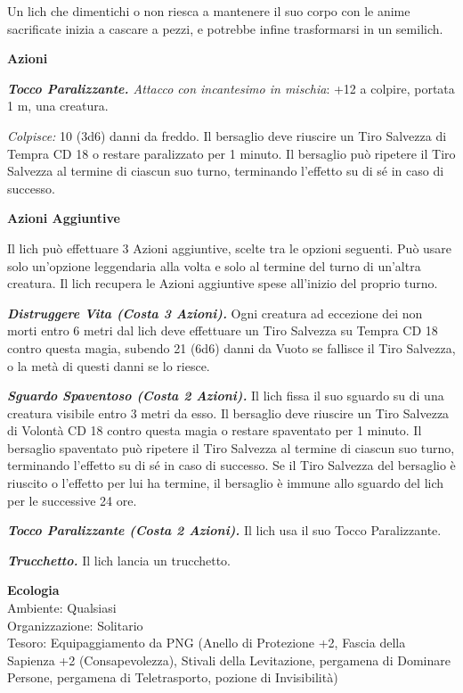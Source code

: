 \begin{multicols}{2}
Un lich che dimentichi o non riesca a mantenere il suo corpo con le anime sacrificate inizia a cascare a pezzi, e potrebbe infine trasformarsi in un semilich.

\textbf{Azioni}

\emph{\textbf{Tocco Paralizzante.} Attacco con incantesimo in mischia}: +12 a colpire, portata 1 m, una creatura.

\emph{Colpisce:} 10 (3d6) danni da freddo. Il bersaglio deve riuscire un Tiro Salvezza di Tempra CD 18 o restare paralizzato per 1 minuto. Il bersaglio può ripetere il Tiro Salvezza al termine di ciascun suo turno, terminando l'effetto su di sé in caso di successo.

\textbf{Azioni Aggiuntive}

Il lich può effettuare 3 Azioni aggiuntive, scelte tra le opzioni seguenti. Può usare solo un'opzione leggendaria alla volta e solo al termine del turno di un'altra creatura. Il lich recupera le Azioni aggiuntive spese all'inizio del proprio turno.

\emph{\textbf{Distruggere Vita (Costa 3 Azioni).}} Ogni creatura ad eccezione dei non morti entro 6 metri dal lich deve effettuare un Tiro Salvezza su Tempra CD 18 contro questa magia, subendo 21 (6d6) danni da Vuoto se fallisce il Tiro Salvezza, o la metà di questi danni se lo riesce.

\emph{\textbf{Sguardo Spaventoso (Costa 2 Azioni).}} Il lich fissa il suo sguardo su di una creatura visibile entro 3 metri da esso. Il bersaglio deve riuscire un Tiro Salvezza di Volontà CD 18 contro questa magia o restare spaventato per 1 minuto. Il bersaglio spaventato può ripetere il Tiro Salvezza al termine di ciascun suo turno, terminando l'effetto su di sé in caso di successo. Se il Tiro Salvezza del bersaglio è riuscito o l'effetto per lui ha termine, il bersaglio è immune allo sguardo del lich per le successive 24 ore.

\emph{\textbf{Tocco Paralizzante (Costa 2 Azioni).}} Il lich usa il suo Tocco Paralizzante.

\emph{\textbf{Trucchetto.}} Il lich lancia un trucchetto.

\textbf{Ecologia}\\
Ambiente: Qualsiasi\\
Organizzazione: Solitario\\
Tesoro: Equipaggiamento da PNG (Anello di Protezione +2, Fascia della Sapienza +2 (Consapevolezza), Stivali della Levitazione, pergamena di Dominare Persone, pergamena di Teletrasporto, pozione di Invisibilità)\\


\end{multicols}
